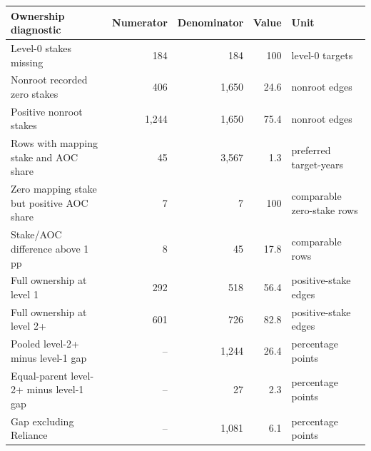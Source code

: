 \begin{tabular}{lrrrl}
\toprule
Ownership diagnostic & Numerator & Denominator & Value & Unit \\
\midrule
Level-0 stakes missing & 184 & 184 & 100 & level-0 targets \\
Nonroot recorded zero stakes & 406 & 1,650 & 24.6 & nonroot edges \\
Positive nonroot stakes & 1,244 & 1,650 & 75.4 & nonroot edges \\
Rows with mapping stake and AOC share & 45 & 3,567 & 1.3 & preferred target-years \\
Zero mapping stake but positive AOC share & 7 & 7 & 100 & comparable zero-stake rows \\
Stake/AOC difference above 1 pp & 8 & 45 & 17.8 & comparable rows \\
Full ownership at level 1 & 292 & 518 & 56.4 & positive-stake edges \\
Full ownership at level 2+ & 601 & 726 & 82.8 & positive-stake edges \\
Pooled level-2+ minus level-1 gap & -- & 1,244 & 26.4 & percentage points \\
Equal-parent level-2+ minus level-1 gap & -- & 27 & 2.3 & percentage points \\
Gap excluding Reliance & -- & 1,081 & 6.1 & percentage points \\
\bottomrule
\end{tabular}
